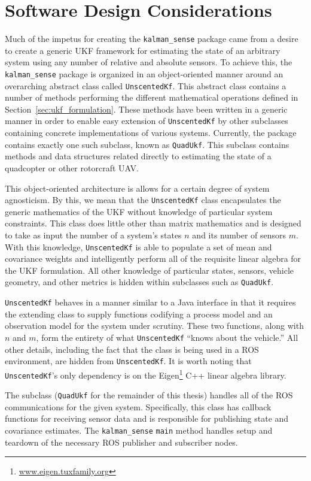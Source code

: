 \section{Software Design Considerations}

Much of the impetus for creating the \texttt{kalman\_sense} package came from a desire to create a generic UKF framework for estimating the state of an arbitrary system using any number of relative and absolute sensors. To achieve this, the \texttt{kalman\_sense} package is organized in an object-oriented manner around an overarching abstract class called \texttt{UnscentedKf}. This abstract class contains a number of methods performing the different mathematical operations defined in Section~\ref{sec:ukf_formulation}. These methods have been written in a generic manner in order to enable easy extension of \texttt{UnscentedKf} by other subclasses containing concrete implementations of various systems. Currently, the package contains exactly one such subclass, known as \texttt{QuadUkf}. This subclass contains methods and data structures related directly to estimating the state of a quadcopter or other rotorcraft UAV.

This object-oriented architecture is allows for a certain degree of system agnosticism. By this, we mean that the \texttt{UnscentedKf} class encapsulates the generic mathematics of the UKF without knowledge of particular system constraints. This class does little other than matrix mathematics and is designed to take as input the number of a system's states $n$ and its number of sensors $m$. With this knowledge, \texttt{UnscentedKf} is able to populate a set of mean and covariance weights and intelligently perform all of the requisite linear algebra for the UKF formulation. All other knowledge of particular states, sensors, vehicle geometry, and other metrics is hidden within subclasses such as \texttt{QuadUkf}.

\texttt{UnscentedKf} behaves in a manner similar to a Java interface in that it requires the extending class to supply functions codifying a process model and an observation model for the system under scrutiny. These two functions, along with $n$ and $m$, form the entirety of what \texttt{UnscentedKf} ``knows about the vehicle.'' All other details, including the fact that the class is being used in a ROS environment, are hidden from \texttt{UnscentedKf}. It is worth noting that \texttt{UnscentedKf}'s only dependency is on the Eigen\footnote{\url{www.eigen.tuxfamily.org}} C++ linear algebra library.

The subclass (\texttt{QuadUkf} for the remainder of this thesis) handles all of the ROS communications for the given system. Specifically, this class has callback functions for receiving sensor data and is responsible for publishing state and covariance estimates. The \texttt{kalman\_sense} \texttt{main} method handles setup and teardown of the necessary ROS publisher and subscriber nodes.

